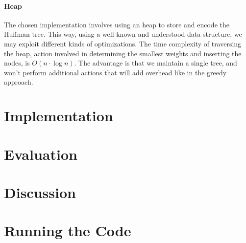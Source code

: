 \documentclass[10pt]{article}
\begin{document}
\paragraph{Heap} The chosen implementation involves using an heap to store and encode the Huffman tree. This way, using a well-known and understood data structure, we may exploit different kinds of optimizations. The time complexity of traversing the heap, action involved in determining the smallest weights and inserting the nodes, is $O(n\cdot\log n)$. The advantage is that we maintain a single tree, and won't perform additional actions that will add overhead like in the greedy approach.
\section{Implementation}
\section{Evaluation}
\section{Discussion}
\section{Running the Code} 
\end{document}
